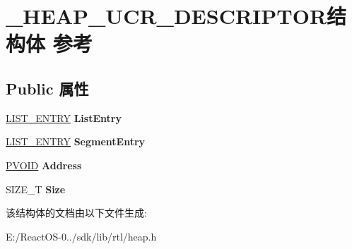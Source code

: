 \hypertarget{struct___h_e_a_p___u_c_r___d_e_s_c_r_i_p_t_o_r}{}\section{\+\_\+\+H\+E\+A\+P\+\_\+\+U\+C\+R\+\_\+\+D\+E\+S\+C\+R\+I\+P\+T\+O\+R结构体 参考}
\label{struct___h_e_a_p___u_c_r___d_e_s_c_r_i_p_t_o_r}
\subsection*{Public 属性}
\begin{DoxyCompactItemize}
\item 
\mbox{\label{struct___h_e_a_p___u_c_r___d_e_s_c_r_i_p_t_o_r_a86e4f80794335d2b9e2040d13d7e58ab}} 
\hyperlink{struct___l_i_s_t___e_n_t_r_y}{L\+I\+S\+T\+\_\+\+E\+N\+T\+RY} {\bfseries List\+Entry}
\item 
\mbox{\label{struct___h_e_a_p___u_c_r___d_e_s_c_r_i_p_t_o_r_a23dfe8b0baeac4b111ab350d360e3073}} 
\hyperlink{struct___l_i_s_t___e_n_t_r_y}{L\+I\+S\+T\+\_\+\+E\+N\+T\+RY} {\bfseries Segment\+Entry}
\item 
\mbox{\label{struct___h_e_a_p___u_c_r___d_e_s_c_r_i_p_t_o_r_a023808d09e67e41bd2665a643b34beb1}} 
\hyperlink{interfacevoid}{P\+V\+O\+ID} {\bfseries Address}
\item 
\mbox{\label{struct___h_e_a_p___u_c_r___d_e_s_c_r_i_p_t_o_r_ab1251796fce3edf9f304a161b4e23154}} 
S\+I\+Z\+E\+\_\+T {\bfseries Size}
\end{DoxyCompactItemize}


该结构体的文档由以下文件生成\+:\begin{DoxyCompactItemize}
\item 
E\+:/\+React\+O\+S-\/0../sdk/lib/rtl/heap.\+h\end{DoxyCompactItemize}
